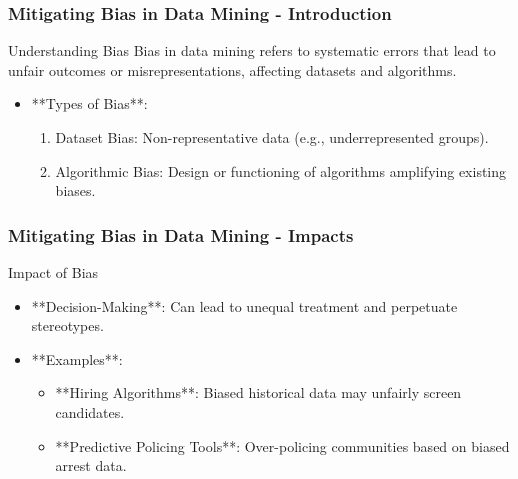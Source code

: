 \documentclass{beamer}
\begin{document}
\begin{frame}[fragile]
    \frametitle{Mitigating Bias in Data Mining - Introduction}
    \begin{block}{Understanding Bias}
        Bias in data mining refers to systematic errors that lead to unfair outcomes or misrepresentations, affecting datasets and algorithms.
    \end{block}
    
    \begin{itemize}
        \item **Types of Bias**:
        \begin{enumerate}
            \item Dataset Bias: Non-representative data (e.g., underrepresented groups).
            \item Algorithmic Bias: Design or functioning of algorithms amplifying existing biases.
        \end{enumerate}
    \end{itemize}
\end{frame}

\begin{frame}[fragile]
    \frametitle{Mitigating Bias in Data Mining - Impacts}
    \begin{block}{Impact of Bias}
        \begin{itemize}
            \item **Decision-Making**: Can lead to unequal treatment and perpetuate stereotypes.
            \item **Examples**:
                \begin{itemize}
                    \item **Hiring Algorithms**: Biased historical data may unfairly screen candidates.
                    \item **Predictive Policing Tools**: Over-policing communities based on biased arrest data.
                \end{itemize}
        \end{itemize}
    \end{block}
\end{frame}
\end{document}
